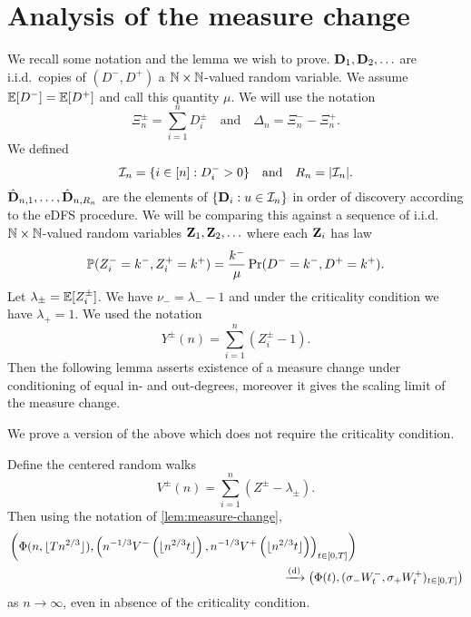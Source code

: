 \section{Analysis of the measure change}
\label{sec:measure-change}

We recall some notation and the lemma we wish to prove. $\vD_1, \vD_2, \ldots$ are i.i.d.\ copies of $(D^-, D^+)$ a $\N \times \N$-valued random variable. We assume $\E[D^-] = \E[D^+]$ and call this quantity $\mu$. We will use the notation
\begin{equation*}
    \Xi^{\pm}_n = \textstyle \sum_{i=1}^n D^{\pm}_i
    \quad \text{and} \quad
    \Delta_n = \Xi^-_n - \Xi^+_n.
\end{equation*}
We defined
\begin{equation*}
    \cI_n = \{ i \in [n] : D_i^- > 0 \} \quad \text{and} \quad R_n = \abs{\cI_n}.
\end{equation*}
$\hat{\vD}_{n, 1}, \ldots, \hat{\vD}_{n, R_n}$ are the elements of $\{\vD_i : u \in \cI_n\}$ in order of discovery according to the eDFS procedure. We will be comparing this against a sequence of i.i.d.\ $\N \times \N$-valued random variables $\vZ_1, \vZ_2, \ldots$ where each $\vZ_i$ has law
\begin{equation*}
    \P(Z_i^- = k^-, Z_i^+ = k^+) = \frac{k^-}{\mu} \Pr(D^- = k^-, D^+ = k^+).
\end{equation*}
Let $\lambda_{\pm} = \E[Z^{\pm}_i]$. We have $\nu_- = \lambda_- - 1$ and under the criticality condition we have $\lambda_+ = 1$. We used the notation
\begin{equation*}
    Y^{\pm}(n) = \sum_{i=1}^n (Z^{\pm}_i - 1).
\end{equation*}
Then the following lemma asserts existence of a measure change under conditioning of equal in- and out-degrees, moreover it gives the scaling limit of the measure change.

\measurechange*

We prove a version of the above which does not require the criticality condition.

\begin{lemma}
    \label{lem:measure-change-no-crit}
    Define the centered random walks
    \begin{equation*}
        V^{\pm}(n) = \sum_{i=1}^n (Z^{\pm} - \lambda_{\pm}).
    \end{equation*}
    Then using the notation of \cref{lem:measure-change},
    \begin{align*}
        &\left( 
            \Phi(n, \floor{T n^{2/3}}),
            \left(
                n^{-1/3} V^-\left( \floor{n^{2/3} t} \right),
                n^{-1/3} V^+\left( \floor{n^{2/3} t} \right)
            \right)_{t \in [0, T]}
        \right) \\
        & \hspace{23em} \todist \left( 
            \Phi(t),
            (\sigma_- W^-_t, \sigma_+ W^+_t)_{t \in [0, T]}
        \right)
    \end{align*}
    as $n \to \infty$, even in absence of the criticality condition.
\end{lemma}

